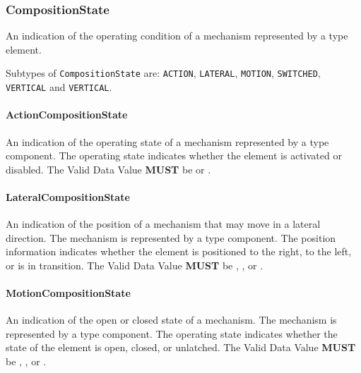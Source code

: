 \FloatBarrier

\subsubsection{CompositionState}
\label{sec:CompositionState}



An indication of the operating condition of a mechanism represented by a  type element.


Subtypes of \texttt{CompositionState} are: \texttt{ACTION}, \texttt{LATERAL}, \texttt{MOTION}, \texttt{SWITCHED}, \texttt{VERTICAL} and \texttt{VERTICAL}. 
\FloatBarrier

\paragraph{ActionCompositionState}\mbox{}
\label{sec:ActionCompositionState}



An indication of the operating state of a mechanism represented by a  type component.
 The operating state indicates whether the  element is activated or disabled. 
 The \gls{Valid Data Value} \textbf{MUST} be  or .


\paragraph{LateralCompositionState}\mbox{}
\label{sec:LateralCompositionState}



An indication of the position of a mechanism that may move in a lateral direction.   The mechanism is represented by a  type component. 
 The position information indicates whether the  element is positioned to the right, to the left, or is in transition.  
 The \gls{Valid Data Value} \textbf{MUST} be , , or .


\paragraph{MotionCompositionState}\mbox{}
\label{sec:MotionCompositionState}



An indication of the open or closed state of a mechanism.   The mechanism is represented by a  type component. 
 The operating state indicates whether the state of the  element is open, closed, or unlatched.   
 The \gls{Valid Data Value} \textbf{MUST} be , , or .


